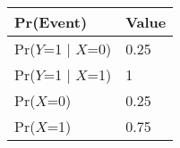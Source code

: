 \begin{tabular}{|l|l|}\hline
	Pr(Event)	&Value \\ \hline
	Pr($Y$=1 $\mid$ $X$=0) &0.25 \\ \hline
	Pr($Y$=1 $\mid$ $X$=1) &1  \\ \hline
	Pr($X$=0) &0.25 \\ \hline
	Pr($X$=1)	&0.75 \\ \hline
	
\end{tabular}
